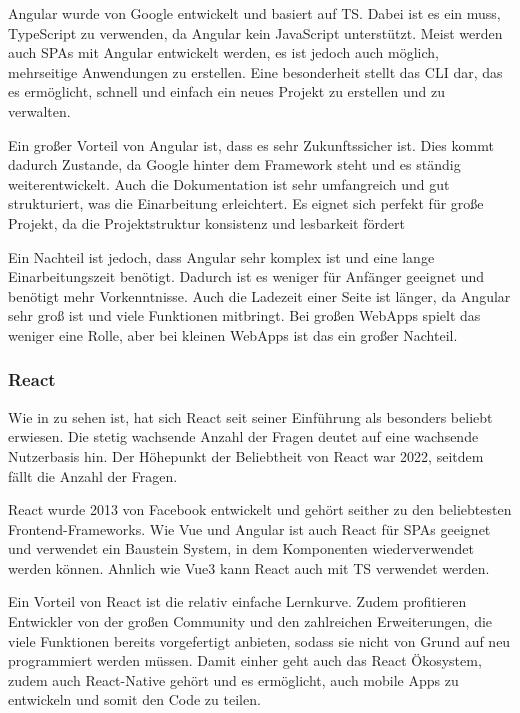 \documentclass[biblatex]{lni}
\begin{document}
Angular wurde von Google entwickelt und basiert auf \ac{TS}. \cite{NG}
Dabei ist es ein muss, TypeScript zu verwenden, da Angular kein JavaScript unterstützt.
Meist werden auch \ac{SPA}s mit Angular entwickelt werden, es ist jedoch auch möglich, mehrseitige Anwendungen zu erstellen.
Eine besonderheit stellt das \ac{CLI} dar, das es ermöglicht, schnell und einfach ein neues Projekt zu erstellen und zu verwalten.

Ein großer Vorteil von Angular ist, dass es sehr Zukunftssicher ist. \cite{BStack}
Dies kommt dadurch Zustande, da Google hinter dem Framework steht und es ständig weiterentwickelt.
Auch die Dokumentation ist sehr umfangreich und gut strukturiert, was die Einarbeitung erleichtert. \cite{NG}
Es eignet sich perfekt für große Projekt, da die Projektstruktur konsistenz und lesbarkeit fördert

Ein Nachteil ist jedoch, dass Angular sehr komplex ist und eine lange Einarbeitungszeit benötigt. \cite{BStack}
Dadurch ist es weniger für Anfänger geeignet und benötigt mehr Vorkenntnisse.
Auch die Ladezeit einer Seite ist länger, da Angular sehr groß ist und viele Funktionen mitbringt.
Bei großen WebApps spielt das weniger eine Rolle, aber bei kleinen WebApps ist das ein großer Nachteil.

\subsubsection{React}

Wie in  zu sehen ist, hat sich React seit seiner Einführung als besonders beliebt erwiesen.
Die stetig wachsende Anzahl der Fragen deutet auf eine wachsende Nutzerbasis hin.
Der Höhepunkt der Beliebtheit von React war 2022, seitdem fällt die Anzahl der Fragen.

React wurde 2013 von Facebook entwickelt und gehört seither zu den beliebtesten Frontend-Frameworks. \cite{BStack}
Wie Vue und Angular ist auch React für \ac{SPA}s geeignet und verwendet ein Baustein System, in dem Komponenten wiederverwendet werden können.
Ahnlich wie Vue3 kann React auch mit \ac{TS} verwendet werden.\cite{RCT}

Ein Vorteil von React ist die relativ einfache Lernkurve. \cite{BStack}
Zudem profitieren Entwickler von der großen Community und den zahlreichen Erweiterungen,
die viele Funktionen bereits vorgefertigt anbieten,
sodass sie nicht von Grund auf neu programmiert werden müssen.
Damit einher geht auch das React Ökosystem, zudem auch React-Native gehört und es ermöglicht,
auch mobile Apps zu entwickeln und somit den Code zu teilen. \cite{RCTN}
\end{document}
